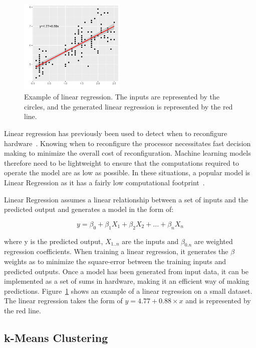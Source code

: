 \begin{figure}[t]
    \centering
    \includegraphics[width=0.45\textwidth]{background/graphics/lin_reg_ex.pdf}
    \caption{Example of linear regression. The inputs are represented by the circles, and the generated linear regression is represented by the red line.}
    \label{fig:linregex}
\end{figure}
Linear regression has previously been used to detect when to reconfigure hardware~\cite{tavanaElastic}.
Knowing when to reconfigure the processor necessitates fast decision making to minimize the overall cost of reconfiguration.
Machine learning models therefore need to be lightweight to ensure that the computations required to operate the model are as low as possible.
In these situations, a popular model is Linear Regression as it has a fairly low computational footprint~\cite{tavanaElastic}.

Linear Regression assumes a linear relationship between a set of inputs and the predicted output and generates a model in the form of:

\begin{equation}
y = \beta_0 + \beta_1X_1 + \beta_2X_2 + ... + \beta_nX_n
\end{equation}

where y is the predicted output, $X_{1..n}$ are the inputs and $\beta_{0.n}$ are weighted regression coefficients.
When training a linear regression, it generates the $\beta$ weights as to minimize the square-error between the training inputs and predicted outputs.
Once a model has been generated from input data, it can be implemented as a set of sums in hardware, making it an efficient way of making predictions.
Figure~\ref{fig:linregex} shows an example of a linear regression on a small dataset.
The linear regression takes the form of $y=4.77 + 0.88 \times x$ and is represented by the red line.

\subsection{k-Means Clustering}~\label{sec:kMeans}

